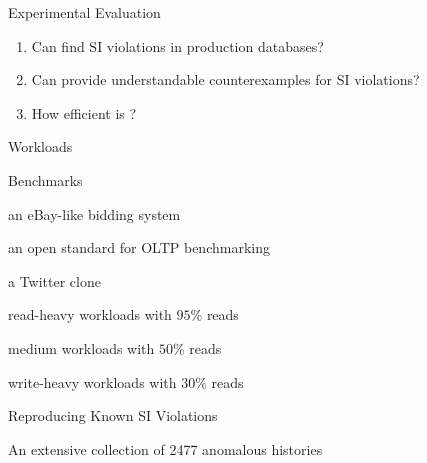 
\begin{frame}{Experimental Evaluation}
	\begin{center}
		\begin{enumerate}[(1)]
			\setlength{\itemsep}{15pt}
			\item {}
			  Can \polysi{} find SI violations in production databases?
			\item {}
			  Can \polysi{} provide understandable counterexamples for SI violations?
			\item {}
			  How efficient is \polysi?
		\end{enumerate}

	\end{center}
\end{frame}

\begin{frame}{Workloads}
	\begin{center}
		{}
	\end{center}
\end{frame}

\begin{frame}{Benchmarks}
	\begin{center}
		\begin{description}[GeneralRW:]
			\setlength{\itemsep}{10pt}
			\item[RuBiS:] an eBay-like bidding system
			\item[TPC-C:] an open standard for OLTP benchmarking
			\item[C-Twitter:] a Twitter clone
			\vspace{10pt}
			\item[GeneralRH:] read-heavy workloads with $95\%$ reads
			\item[GeneralRW:] medium workloads with $50\%$ reads
			\item[GeneralWH:] write-heavy workloads with $30\%$ reads
		\end{description}
	\end{center}
\end{frame}

\begin{frame}{Reproducing Known SI Violations}
	\begin{center}
		{}
		\vspace{0.80cm}

		An extensive collection of 2477 anomalous histories \\[2pt]
	\end{center}
\end{frame}

